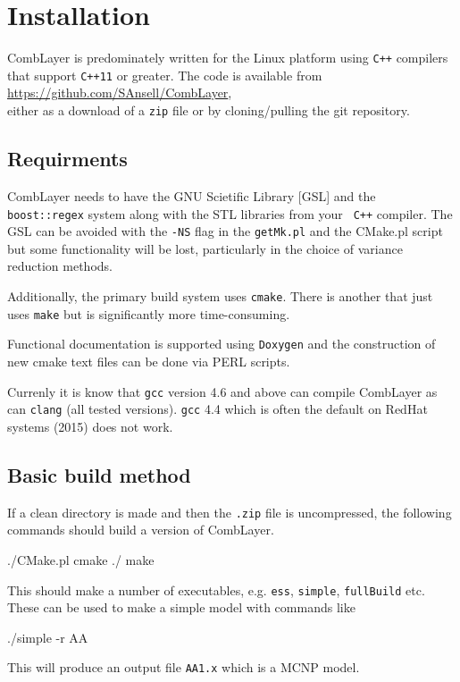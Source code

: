 \section{Installation}

CombLayer is predominately written for the Linux platform using {\tt C++}
compilers that support {\tt C++11} or greater. The code is available from \\
\href{https://github.com/SAnsell/CombLayer}{https://github.com/SAnsell/CombLayer}, \\ either as a download of a {\tt zip} file or
by cloning/pulling the git repository.

\subsection{Requirments}

CombLayer needs to have the GNU Scietific Library [GSL] and the {\tt
  boost::regex} system along with the STL libraries from your {\tt
  C++} compiler. The GSL can be avoided with the {\tt -NS} flag in the
{\tt getMk.pl} and the CMake.pl script but some functionality will be
lost, particularly in the choice of variance reduction methods.

Additionally, the primary build system uses {\tt cmake}. There is another
that just uses {\tt make} but is significantly more time-consuming.

Functional documentation is supported using {\tt Doxygen} and the construction
of new cmake text files can be done via PERL scripts.

Currenly it is know that {\tt gcc} version 4.6 and above can compile
CombLayer as can {\tt clang} (all tested versions). {\tt gcc} 4.4 which is often
the default on RedHat systems (2015) does not work.

\subsection{Basic build method}

If a clean directory is made and then the {\tt .zip} file is uncompressed, the
following commands should build a version of CombLayer.

\begin{bash}
  ./CMake.pl
  cmake ./
  make
\end{bash}

This should make a number of executables, e.g. {\tt ess}, {\tt simple}, {\tt fullBuild} etc. These
can be used to make a simple model with commands like
\begin{bash}
  ./simple -r AA
\end{bash}
This will produce an output file {\tt AA1.x} which is a MCNP model.



